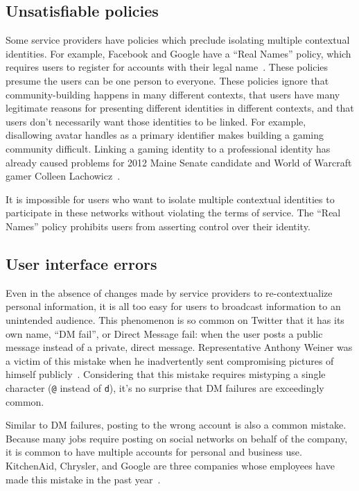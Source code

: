 \documentclass[10pt, conference, compsocconf]{IEEEtran}
\begin{document}
\subsection{Unsatisfiable policies}
\label{sec:policies}
Some service providers have policies which preclude isolating multiple
contextual identities. For example, Facebook and Google have a ``Real Names'' policy, which
requires users to register for accounts with their legal
name~\cite{fb_names,google_names}.  These policies presume the users can be one
person to everyone. These policies ignore that community-building happens in
many different contexts, that users have many legitimate reasons for presenting
different identities in different contexts, and that users don't necessarily
want those identities to be linked. For example, disallowing avatar handles as
a primary identifier makes building a gaming community difficult. 
Linking a gaming identity to a professional identity has already caused
problems for 2012 Maine Senate candidate and World of Warcraft gamer Colleen
Lachowicz~\cite{maine}.

It is impossible for users who want to isolate multiple contextual identities
to participate in these networks without violating the terms of service.  The
``Real Names'' policy prohibits users from asserting control over their identity.

\subsection{User interface errors}
Even in the absence of changes made by service providers to re-contextualize
personal information, it is all too easy for users to broadcast information to
an unintended audience. This phenomenon is so common on Twitter that it has its
own name, ``DM fail'', or Direct Message fail: when the user posts a public
message instead of a private, direct message. Representative Anthony Weiner was
a victim of this mistake when he inadvertently sent compromising pictures of
himself publicly~\cite{weiner}. Considering that this mistake requires
mistyping a single character (\texttt{@} instead of \texttt{d}), it's no
surprise that DM failures are exceedingly common.

Similar to DM failures, posting to the wrong account is also a common mistake.
Because many jobs require posting on social networks on behalf of the company,
it is common to have multiple accounts for personal and business use.
KitchenAid, Chrysler, and Google are three companies whose employees have
made this mistake in the past year~\cite{kitchenaid,chrysler,yegge}.
\end{document}
